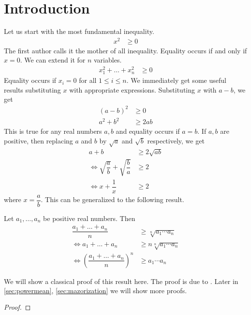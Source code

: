 \documentclass{subfile}
\begin{document}
	\section{Introduction}\label{sec:intro}%
	Let us start with the most fundamental inequality.
		\begin{align}
			x^2
				& \geq0\label{ineq:mother}
		\end{align}
	The first author calls it the mother of all inequality. Equality occurs if and only if $x=0$. We can extend it for $n$ variables.
		\begin{align}
			x_1^2+\ldots+x_n^2
				& \geq0\label{ineq:extendedmother}
		\end{align}
	Equality occurs if $x_i=0$ for all $1\leq i\leq n$. We immediately get some useful results substituting $x$ with appropriate expressions. Substituting $x$ with $a-b$, we get
		\begin{align*}
			(a-b)^2
				& \geq0\\
			a^2+b^2
				& \geq2ab
		\end{align*}
	This is true for any real numbers $a,b$ and equality occurs if $a=b$. If $a,b$ are positive, then replacing $a$ and $b$ by $\sqrt{a}$ and $\sqrt{b}$ respectively, we get
		\begin{align*}
			a+b
				& \geq2\sqrt{ab}\\
			\iff\sqrt{\dfrac{a}{b}}+\sqrt{\dfrac{b}{a}}
				& \geq2\\
			\iff x+\dfrac{1}{x}
				& \geq2
		\end{align*}
	where $x=\dfrac{a}{b}$. This can be generalized to the following result.
		\begin{theorem}\label{thm:amgm}
			Let $a_1,\ldots,a_n$ be positive real numbers. Then
				\begin{align*}
					\dfrac{a_1+\ldots+a_n}{n}
						& \geq\sqrt[n]{a_1\cdots a_n}\\
					\iff a_1+\ldots+a_n
						& \geq n\sqrt[n]{a_1\cdots a_n}\\
					\iff \left(\dfrac{a_1+\ldots+a_n}{n}\right)^n
						& \geq a_1\cdots a_n
				\end{align*}
		\end{theorem}
	We will show a classical proof of this result here. The proof is due to \textcite{cauchy_1821}. Later in \autoref{sec:powermean}, \autoref{sec:mazorization} we will show more proofs.
		\begin{proof}
			
		\end{proof}
\end{document}
